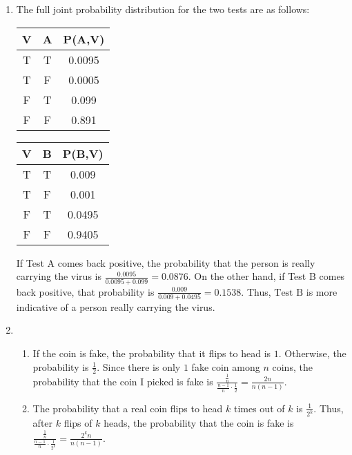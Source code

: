 \documentclass[10pt,letterpaper]{article}
\begin{document}
\begin{enumerate}
	\item The full joint probability distribution for the two tests are as follows:
		\begin{table}[!h]
			\centering
			\begin{tabular}{|c|c|c|} \hline
				{\bf V} & {\bf A} & {\bf P(A,V)} \\ \hline\hline
				T & T & 0.0095 \\ \hline
				T & F & 0.0005 \\ \hline
				F & T & 0.099  \\ \hline
				F & F & 0.891  \\ \hline
			\end{tabular}
			\hspace{1cm}
			\begin{tabular}{|c|c|c|} \hline
				{\bf V} & {\bf B} & {\bf P(B,V)} \\ \hline\hline
				T & T & 0.009  \\ \hline
				T & F & 0.001  \\ \hline
				F & T & 0.0495 \\ \hline
				F & F & 0.9405 \\ \hline
			\end{tabular}
		\end{table}
		If Test A comes back positive, the probability that the person is
		really carrying the virus is $\frac{0.0095}{0.0095+0.099} = 0.0876$. On
		the other hand, if Test B comes back positive, that probability is
		$\frac{0.009}{0.009+0.0495} = 0.1538$. Thus, $\boxed{\text{Test B}}$ is
		more indicative of a person really carrying the virus.

	\item
		\begin{enumerate}
			\item If the coin is fake, the probability that it flips to head is
				$1$. Otherwise, the probability is $\frac12$. Since there is
				only $1$ fake coin among $n$ coins, the probability that the
				coin I picked is fake is
				$\frac{\frac{1}{n}}{\frac{n-1}{n}\cdot\frac12}
				= \boxed{\frac{2n}{n(n-1)}}$.
			\item The probability that a real coin flips to head $k$ times out
				of $k$ is $\frac{1}{2^k}$. Thus, after $k$ flips of $k$ heads,
				the probability that the coin is fake is
				$\frac{\frac{1}{n}}{\frac{n-1}{n}\cdot\frac{1}{2^k}}
				= \boxed{\frac{2^kn}{n(n-1)}}$.
		\end{enumerate}
\end{enumerate}
\end{document}
